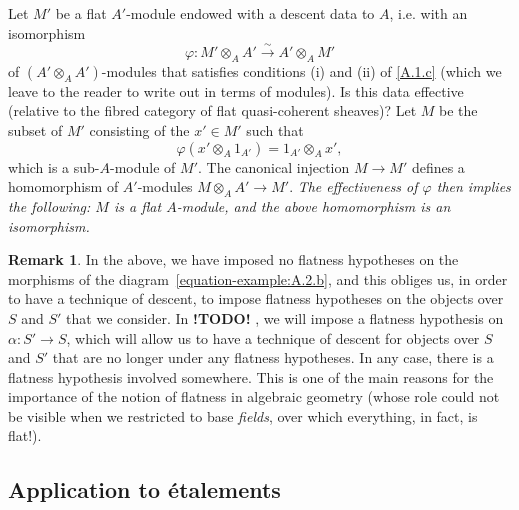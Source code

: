 \documentclass{article}
\theoremstyle{plain}
\theoremstyle{definition}
\newtheorem*{remark}{Remark}
\newcommand{\todo}{\textbf{ !TODO! }}
\newcommand{\oldpage}[1]{\marginpar{\footnotesize$\Big\vert$ \textit{p.~#1}}}
\begin{document}
Let $M'$ be a flat $A'$-module endowed with a descent data to $A$, i.e. with an isomorphism
\[
  \varphi\colon M'\otimes_A A' \xrightarrow{\sim} A'\otimes_A M'
\]
of $(A'\otimes_A A')$-modules that satisfies conditions (i) and (ii) of \cref{A.1.c} (which we leave to the reader to write out in terms of modules).
Is this data effective (relative to the fibred category of flat quasi-coherent sheaves)?
Let $M$ be the subset of $M'$ consisting of the $x'\in M'$ such that
\[
  \varphi(x'\otimes_A 1_{A'}) = 1_{A'}\otimes_A x',
\]
which is a sub-$A$-module of $M'$.
The canonical injection $M\to M'$ defines a homomorphism of $A'$-modules $M\otimes_A A'\to M'$.
\emph{The effectiveness of $\varphi$ then implies the following: $M$ is a flat $A$-module, and the above homomorphism is an isomorphism.}

\begin{remark}
  In the above, we have imposed no flatness hypotheses on the morphisms of the diagram~\cref{equation-example:A.2.b}, and this obliges us, in order to have a technique of descent, to impose flatness hypotheses on the objects over $S$ and $S'$ that we consider.
  In \todo, we will impose a flatness hypothesis on $\alpha\colon S'\to S$, which will allow us to have a technique of descent for objects over $S$ and $S'$ that are no longer under any flatness hypotheses.
  In any case, there is a flatness hypothesis involved somewhere.
  This is one of the main reasons for the importance of the notion of flatness in algebraic geometry (whose role could not be visible when we restricted to base \emph{fields}, over which everything, in fact, is flat!).
\end{remark}


\oldpage{190-10}
\subsection{Application to \'{e}talements}
\label{A.3}
\end{document}
